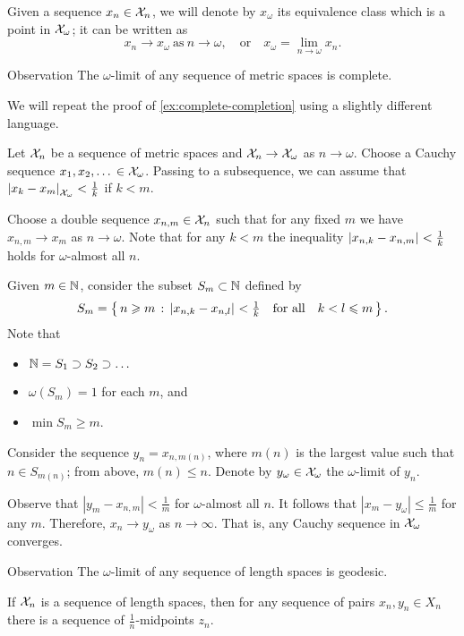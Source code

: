 Given a sequence $x_n\in \mathcal{X}_n$,
we will denote by $x_\omega$ its equivalence class which is a point in $\mathcal{X}_\omega$;
it can be written as
\[x_n\to x_\omega\ \text{as}\  n\to\omega,
\quad\text{or}\quad
x_\omega=\lim_{n\to\omega} x_n.\]

\begin{thm}{Observation}\label{obs:ultralimit-is-complete}
The $\omega$-limit of any sequence of metric spaces is complete. 
\end{thm}

We will repeat the proof of \ref{ex:complete-completion} using a slightly different language.

Let $\mathcal{X}_n$ be a sequence of metric spaces and $\mathcal{X}_n\to\mathcal{X}_\omega$ as $n\to\omega$.
Choose a Cauchy sequence $x_1,x_2,\dots{}\in\mathcal{X}_\omega$.
Passing to a subsequence, we can assume that $\dist{x_k}{x_{m}}{\spc{X}_\omega}<\tfrac1{k}$ if $k<m$.

Choose a double sequence $x_{n,m}\in \mathcal{X}_n$ such that for any fixed $m$ we have $x_{n,m}\to x_m$ as $n\to\omega$.
Note that for any $k<m$ the inequality $\dist{x_{n,k}}{x_{n,m}}{}<\tfrac1{k}$ holds for $\omega$-almost all $n$.

Given $m\in\mathbb{N}$, consider the subset $S_m\subset\mathbb{N}$ defined by
\[S_m=\set{n\ge m}{\dist{x_{n,k}}{x_{n,l}}{}<\tfrac1{k} \quad\text{for all}\quad k<l\le m}.\]
Note that 
\begin{itemize}
\item $\mathbb{N}= S_1\supset S_2\supset\dots$
\item $\omega(S_m)=1$ for each $m$, and
\item $\min S_m\ge m$.
\end{itemize}

Consider the sequence $y_n=x_{n,m(n)}$, where $m(n)$ is the largest value such that $n\in S_{m(n)}$;
from above, $m(n)\le n$.
Denote by $y_\omega\in \mathcal{X}_\omega$ the $\omega$-limit of $y_n$.

Observe that $|y_m-x_{n,m}|<\tfrac1{m}$ for $\omega$-almost all $n$.
It follows that $|x_m-y_\omega|\le \tfrac1{m}$ for any $m$.
Therefore, $x_n\to y_\omega$ as $n\to \infty$.
That is, any Cauchy sequence in $\mathcal{X}_\omega$ converges.
\qeds

\begin{thm}{Observation}\label{obs:ultralimit-is-geodesic}
The $\omega$-limit of any sequence of length spaces is geodesic. 
\end{thm}

If $\mathcal{X}_n$ is a sequence of length spaces, then for any sequence of pairs $x_n, y_n\in X_n$ there is a sequence of $\tfrac1n$-midpoints $z_n$.

